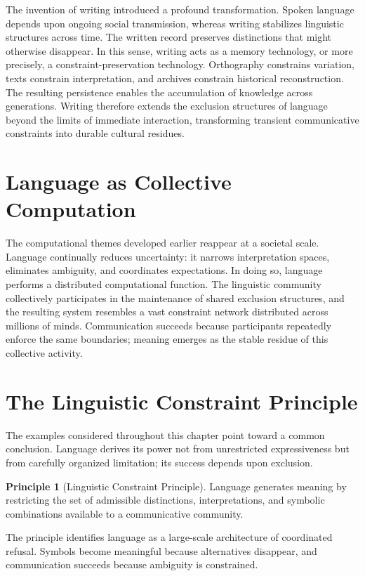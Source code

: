 \documentclass[11pt,oneside]{book}
\theoremstyle{plain}
\theoremstyle{definition}
\newtheorem{principle}[theorem]{Principle}
\theoremstyle{remark}
\begin{document}
The invention of writing introduced a profound transformation. Spoken language depends upon ongoing social transmission, whereas writing stabilizes linguistic structures across time. The written record preserves distinctions that might otherwise disappear. In this sense, writing acts as a memory technology, or more precisely, a constraint-preservation technology. Orthography constrains variation, texts constrain interpretation, and archives constrain historical reconstruction. The resulting persistence enables the accumulation of knowledge across generations. Writing therefore extends the exclusion structures of language beyond the limits of immediate interaction, transforming transient communicative constraints into durable cultural residues.

\section{Language as Collective Computation}

The computational themes developed earlier reappear at a societal scale. Language continually reduces uncertainty: it narrows interpretation spaces, eliminates ambiguity, and coordinates expectations. In doing so, language performs a distributed computational function. The linguistic community collectively participates in the maintenance of shared exclusion structures, and the resulting system resembles a vast constraint network distributed across millions of minds. Communication succeeds because participants repeatedly enforce the same boundaries; meaning emerges as the stable residue of this collective activity.

\section{The Linguistic Constraint Principle}

The examples considered throughout this chapter point toward a common conclusion. Language derives its power not from unrestricted expressiveness but from carefully organized limitation; its success depends upon exclusion.

\begin{principle}[Linguistic Constraint Principle]
Language generates meaning by restricting the set of admissible distinctions, interpretations, and symbolic combinations available to a communicative community.
\end{principle}

The principle identifies language as a large-scale architecture of coordinated refusal. Symbols become meaningful because alternatives disappear, and communication succeeds because ambiguity is constrained.
\end{document}
